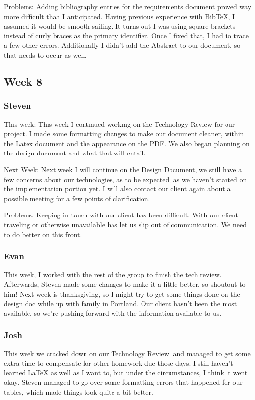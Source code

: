 \documentclass[onecolumn, draftclsnofoot,10pt, compsoc]{IEEEtran}
\begin{document}
Problems:
Adding bibliography entries for the requirements document proved way more difficult than I anticipated. Having previous experience with BibTeX, I assumed it would be smooth sailing. It turns out I was using square brackets instead of curly braces as the primary identifier. Once I fixed that, I had to trace a few other errors. Additionally I didn't add the Abstract to our document, so that needs to occur as well.
\subsection{Week 8}
\subsubsection{Steven}

This week:
This week I continued working on the Technology Review for our project. I made some formatting changes to make our document cleaner, within the Latex document and the appearance on the PDF. We also began planning on the design document and what that will entail.

Next Week:
Next week I will continue on the Design Document, we still have a few concerns about our technologies, as to be expected, as we haven't started on the implementation portion yet. I will also contact our client again about a possible meeting for a few points of clarification. 

Problems:
Keeping in touch with our client has been difficult. With our client traveling or otherwise unavailable has let us slip out of communication. We need to do better on this front.

\subsubsection{Evan}

This week, I worked with the rest of the group to finish the tech review. Afterwards, Steven made some changes to make it a little better, so shoutout to him! Next week is thanksgiving, so I might try to get some things done on the design doc while up with family in Portland. Our client hasn't been the most available, so we're pushing forward with the information available to us.

\subsubsection{Josh}

This week we cracked down on our Technology Review, and managed to get some extra time to compensate for other homework due those days. I still haven't learned LaTeX as well as I want to, but under the circumstances, I think it went okay. Steven managed to go over some formatting errors that happened for our tables, which made things look quite a bit better. 
\end{document}
